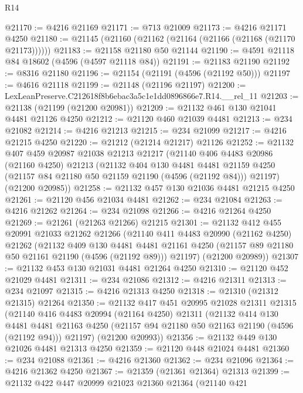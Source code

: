 \begin{lexlean}{R14}
\begin{coremodule}
@21170 := @4216 @21169
@21171 := @713 @21009
@21173 := @4216 @21171 @4250
@21180 := @21145 (@21160 (@21162 (@21164 (@21166 (@21168 (@21170 @21173))))))
@21183 := @21158 @21180 @50 @21144
@21190 := @4591 @21118 @84 @18602 (@4596 (@4597 @21118 @84))
@21191 := @21183 @21190
@21192 := @8316 @21180
@21196 := @21154 (@21191 (@4596 (@21192 @50)))
@21197 := @4616 @21118
@21199 := @21148 (@21196 @21197)
@21200 := LexLeanPreserve.C212618f8b6ebac3a5c1e1dd0896866e7.R14.__rel_11
@21203 := @21138 (@21199 (@21200 @20981))
@21209 := @21132 @461 @130 @21041 @4481 @21126 @4250
@21212 := @21120 @460 @21039 @4481
@21213 := @234 @21082
@21214 := @4216 @21213
@21215 := @234 @21099
@21217 := @4216 @21215 @4250
@21220 := @21212 (@21214 @21217) @21126
@21252 := @21132
    @407
    @459
    @20987
    @21038
    @21213
    @21217
    (@21140
      @406
      @4483
      @20986
      (@21160 @4250)
      @21213
      (@21132
        @404
        @130
        @4481
        @4481
        @21159
        @4250
        (@21157 @84 @21180 @50 @21159 @21190 (@4596 (@21192 @84)))
        @21197)
      (@21200 @20985))
@21258 := @21132 @457 @130 @21036 @4481 @21215 @4250
@21261 := @21120 @456 @21034 @4481
@21262 := @234 @21084
@21263 := @4216 @21262
@21264 := @234 @21098
@21266 := @4216 @21264 @4250
@21269 := @21261 (@21263 @21266) @21215
@21301 := @21132
    @412
    @455
    @20991
    @21033
    @21262
    @21266
    (@21140
      @411
      @4483
      @20990
      (@21162 @4250)
      @21262
      (@21132
        @409
        @130
        @4481
        @4481
        @21161
        @4250
        (@21157 @89 @21180 @50 @21161 @21190 (@4596 (@21192 @89)))
        @21197)
      (@21200 @20989))
@21307 := @21132 @453 @130 @21031 @4481 @21264 @4250
@21310 := @21120 @452 @21029 @4481
@21311 := @234 @21086
@21312 := @4216 @21311
@21313 := @234 @21097
@21315 := @4216 @21313 @4250
@21318 := @21310 (@21312 @21315) @21264
@21350 := @21132
    @417
    @451
    @20995
    @21028
    @21311
    @21315
    (@21140
      @416
      @4483
      @20994
      (@21164 @4250)
      @21311
      (@21132
        @414
        @130
        @4481
        @4481
        @21163
        @4250
        (@21157 @94 @21180 @50 @21163 @21190 (@4596 (@21192 @94)))
        @21197)
      (@21200 @20993))
@21356 := @21132 @449 @130 @21026 @4481 @21313 @4250
@21359 := @21120 @448 @21024 @4481
@21360 := @234 @21088
@21361 := @4216 @21360
@21362 := @234 @21096
@21364 := @4216 @21362 @4250
@21367 := @21359 (@21361 @21364) @21313
@21399 := @21132
    @422
    @447
    @20999
    @21023
    @21360
    @21364
    (@21140
      @421

\end{coremodule}
\end{lexlean}
